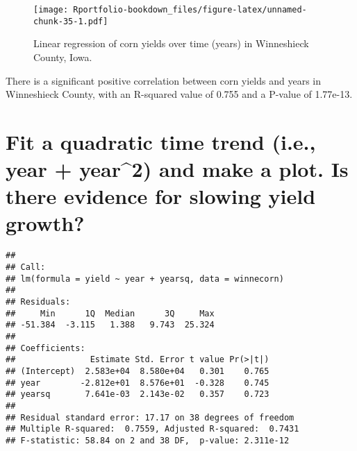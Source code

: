 \documentclass[
]{book}
\newenvironment{Shaded}{\begin{snugshade}}{\end{snugshade}}
\newcommand{\CommentTok}[1]{\textcolor[rgb]{0.56,0.35,0.01}{\textit{#1}}}
\newcommand{\DecValTok}[1]{\textcolor[rgb]{0.00,0.00,0.81}{#1}}
\newcommand{\FunctionTok}[1]{\textcolor[rgb]{0.00,0.00,0.00}{#1}}
\newcommand{\NormalTok}[1]{#1}
\newcommand{\OtherTok}[1]{\textcolor[rgb]{0.56,0.35,0.01}{#1}}
\newcommand{\SpecialCharTok}[1]{\textcolor[rgb]{0.00,0.00,0.00}{#1}}
\begin{document}
\begin{figure}
\centering
\texttt{[image: Rportfolio-bookdown\_files/figure-latex/unnamed-chunk-35-1.pdf]}
\caption{\label{fig:unnamed-chunk-35}Linear regression of corn yields over time (years) in Winneshieck County, Iowa.}
\end{figure}

There is a significant positive correlation between corn yields and years in Winneshieck County, with an R-squared value of 0.755 and a P-value of 1.77e-13.

\hypertarget{fit-a-quadratic-time-trend-i.e.-year-year2-and-make-a-plot.-is-there-evidence-for-slowing-yield-growth}{%
\section{Fit a quadratic time trend (i.e., year + year\^{}2) and make a plot. Is there evidence for slowing yield growth?}\label{fit-a-quadratic-time-trend-i.e.-year-year2-and-make-a-plot.-is-there-evidence-for-slowing-yield-growth}}

\begin{Shaded}
\end{Shaded}

\begin{verbatim}
## 
## Call:
## lm(formula = yield ~ year + yearsq, data = winnecorn)
## 
## Residuals:
##     Min      1Q  Median      3Q     Max 
## -51.384  -3.115   1.388   9.743  25.324 
## 
## Coefficients:
##               Estimate Std. Error t value Pr(>|t|)
## (Intercept)  2.583e+04  8.580e+04   0.301    0.765
## year        -2.812e+01  8.576e+01  -0.328    0.745
## yearsq       7.641e-03  2.143e-02   0.357    0.723
## 
## Residual standard error: 17.17 on 38 degrees of freedom
## Multiple R-squared:  0.7559, Adjusted R-squared:  0.7431 
## F-statistic: 58.84 on 2 and 38 DF,  p-value: 2.311e-12
\end{verbatim}
\end{document}
